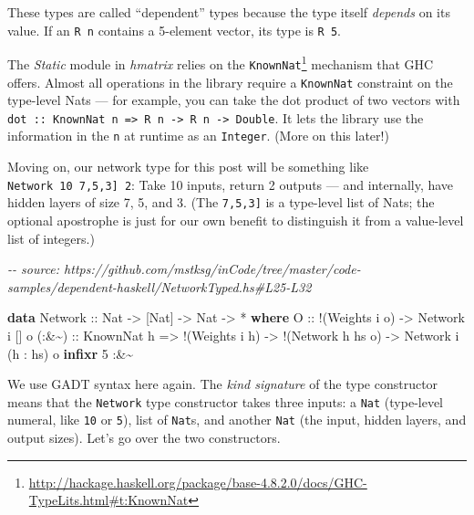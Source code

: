 \documentclass[]{article}
\newenvironment{Shaded}{}{}
\newcommand{\CommentTok}[1]{\textcolor[rgb]{0.38,0.63,0.69}{\textit{#1}}}
\newcommand{\DataTypeTok}[1]{\textcolor[rgb]{0.56,0.13,0.00}{#1}}
\newcommand{\DecValTok}[1]{\textcolor[rgb]{0.25,0.63,0.44}{#1}}
\newcommand{\KeywordTok}[1]{\textcolor[rgb]{0.00,0.44,0.13}{\textbf{#1}}}
\newcommand{\NormalTok}[1]{#1}
\newcommand{\OperatorTok}[1]{\textcolor[rgb]{0.40,0.40,0.40}{#1}}
\newcommand{\OtherTok}[1]{\textcolor[rgb]{0.00,0.44,0.13}{#1}}
\renewcommand{\href}[2]{#2\footnote{\url{#1}}}
\begin{document}
These types are called ``dependent'' types because the type itself
\emph{depends} on its value. If an \texttt{R\ n} contains a 5-element vector,
its type is \texttt{R\ 5}.

The \emph{Static} module in \emph{hmatrix} relies on the
\href{http://hackage.haskell.org/package/base-4.8.2.0/docs/GHC-TypeLits.html\#t:KnownNat}{\texttt{KnownNat}}
mechanism that GHC offers. Almost all operations in the library require a
\texttt{KnownNat} constraint on the type-level Nats --- for example, you can
take the dot product of two vectors with
\texttt{dot\ ::\ KnownNat\ n\ =\textgreater{}\ R\ n\ -\textgreater{}\ R\ n\ -\textgreater{}\ Double}.
It lets the library use the information in the \texttt{n} at runtime as an
\texttt{Integer}. (More on this later!)

Moving on, our network type for this post will be something like
\texttt{Network\ 10\ \textquotesingle{}{[}7,5,3{]}\ 2}: Take 10 inputs, return 2
outputs --- and internally, have hidden layers of size 7, 5, and 3. (The
\texttt{\textquotesingle{}{[}7,5,3{]}} is a type-level list of Nats; the
optional \texttt{\textquotesingle{}} apostrophe is just for our own benefit to
distinguish it from a value-level list of integers.)

\begin{Shaded}
\begin{Highlighting}[]
\CommentTok{{-}{-} source: https://github.com/mstksg/inCode/tree/master/code{-}samples/dependent{-}haskell/NetworkTyped.hs\#L25{-}L32}

\KeywordTok{data} \DataTypeTok{Network}\OtherTok{ ::} \DataTypeTok{Nat} \OtherTok{{-}>}\NormalTok{ [}\DataTypeTok{Nat}\NormalTok{] }\OtherTok{{-}>} \DataTypeTok{Nat} \OtherTok{{-}>} \OperatorTok{*} \KeywordTok{where}
    \DataTypeTok{O}\OtherTok{     ::} \OperatorTok{!}\NormalTok{(}\DataTypeTok{Weights}\NormalTok{ i o)}
          \OtherTok{{-}>} \DataTypeTok{Network}\NormalTok{ i \textquotesingle{}[] o}
\OtherTok{    (:\&\textasciitilde{}) ::} \DataTypeTok{KnownNat}\NormalTok{ h}
          \OtherTok{=>} \OperatorTok{!}\NormalTok{(}\DataTypeTok{Weights}\NormalTok{ i h)}
          \OtherTok{{-}>} \OperatorTok{!}\NormalTok{(}\DataTypeTok{Network}\NormalTok{ h hs o)}
          \OtherTok{{-}>} \DataTypeTok{Network}\NormalTok{ i (h \textquotesingle{}}\OperatorTok{:}\NormalTok{ hs) o}
\KeywordTok{infixr} \DecValTok{5} \OperatorTok{:\&\textasciitilde{}}
\end{Highlighting}
\end{Shaded}

We use GADT syntax here again. The \emph{kind signature} of the type constructor
means that the \texttt{Network} type constructor takes three inputs: a
\texttt{Nat} (type-level numeral, like \texttt{10} or \texttt{5}), list of
\texttt{Nat}s, and another \texttt{Nat} (the input, hidden layers, and output
sizes). Let's go over the two constructors.
\end{document}
